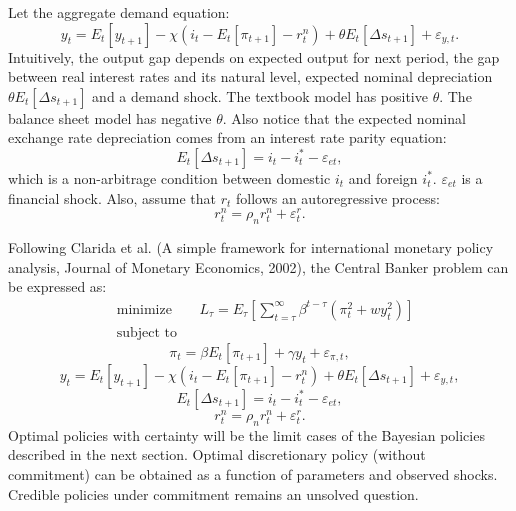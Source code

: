 \documentclass{beamer}
\begin{document}
\begin{frame} 
Let the aggregate demand equation:
\begin{equation}
y_t = E_t[y_{t+1}] - \chi(i_t - E_t[\pi_{t+1}] - r_t^n) + \theta
E_t[\Delta s_{t+1}] + \varepsilon_{y,t}.
\end{equation}
Intuitively, the output gap depends on expected output for next period, the
gap between real interest rates and its natural level, expected
nominal depreciation $\theta
E_t[\Delta s_{t+1}] $ and a demand shock. 
\newline
\newline
The textbook model has positive $\theta$.
The balance sheet model has negative $\theta$.
Also notice that the expected nominal exchange rate depreciation comes from an interest rate parity equation:
\begin{equation}
E_t[\Delta s_{t+1}] = i_t - i_t^* - \varepsilon_{et},
\end{equation}
which is a non-arbitrage condition between domestic $i_t$ and foreign $i_t^*$. $\varepsilon_{et}$
is a financial shock. Also, assume that $r_t$ follows an autoregressive process:
\begin{equation}
r_t^n = \rho_n r_t^n + \varepsilon_t^r.
\end{equation}
\end{frame}

\begin{frame} 
Following Clarida et al. (A simple framework for international monetary
policy analysis, Journal of Monetary Economics, 2002), the Central Banker
problem can be expressed as:
\begin{equation*}
\begin{aligned}
& \underset{}{\text{minimize}}
& & L_\tau = E_\tau \left [ \sum_{t=\tau}^\infty \beta^{t-\tau} (\pi_t^2 +  w y_t^2 ) \right ] \\
& \text{subject to}
\end{aligned}
\end{equation*}
\begin{equation*}
\pi_t = \beta E_t [\pi_{t+1}] + \gamma y_t + \varepsilon_{\pi,t},
\end{equation*}
\begin{equation*}
y_t = E_t[y_{t+1}] - \chi(i_t - E_t[\pi_{t+1}] - r_t^n) + \theta
E_t[\Delta s_{t+1}] + \varepsilon_{y,t},
\end{equation*}
\begin{equation*}
E_t[\Delta s_{t+1}] = i_t - i_t^* - \varepsilon_{et} ,
\end{equation*}
\begin{equation*}
r_t^n = \rho_n r_t^n + \varepsilon_t^r.
\end{equation*}
Optimal policies with certainty will be the limit cases of
the Bayesian policies described in the next section. Optimal discretionary
policy (without commitment) can be obtained as a function of parameters and
observed shocks. Credible policies under commitment remains an unsolved
question.
\end{frame}
\end{document}
